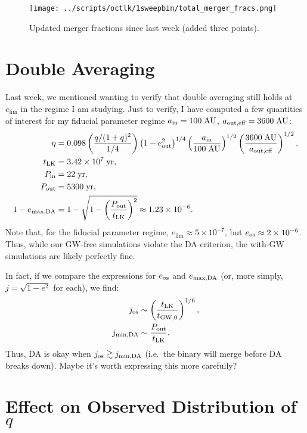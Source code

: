 \documentclass[11pt,
        usenames, %
        dvipsnames %
    ]{article}
\newcommand*{\scinot}[2]{#1\times10^{#2}}
\newcommand*{\p}[1]{\left(#1\right)}
\begin{document}
\begin{figure}[h]
    \centering
    \texttt{[image: ../scripts/octlk/1sweepbin/total\_merger\_fracs.png]}
    \caption{Updated merger fractions since last week (added three points).
    }\label{fig:merger_fracs}
\end{figure}

\section{Double Averaging}

Last week, we mentioned wanting to verify that double averaging still holds at
$e_{\lim}$ in the regime I am studying. Just to verify, I have computed a few
quantities of interest for my fiducial parameter regime $a_{\rm in} =
100\;\mathrm{AU}$, $a_{\rm out, eff} = 3600\;\mathrm{AU}$:
\begin{align}
    \eta &= 0.098\p{\frac{q / (1 + q)^2}{1/4}}\p{1 - e_{\rm out}^2}^{1/4}
        \p{\frac{a_{\rm in}}{100\;\mathrm{AU}}}^{1/2}
        \p{\frac{3600\;\mathrm{AU}}{a_{\rm out, eff}}}^{1/2},\\
    t_{\rm LK} &= \scinot{3.42}{7}\;\mathrm{yr},\\
    P_{\rm in} &= 22\;\mathrm{yr},\\
    P_{\rm out} &= 5300\;\mathrm{yr},\\
    1 - e_{\max, \rm DA} &= 1 - \sqrt{1 - \p{\frac{P_{\rm out}}{t_{\rm LK}}}^2}
        \approx \scinot{1.23}{-6}.
\end{align}
Note that, for the fiducial parameter regime, $e_{\lim} \approx \scinot{5}{-7}$,
but $e_{\rm os} \approx \scinot{2}{-6}$. Thus, while our GW-free simulations
violate the DA criterion, the with-GW simulations are likely perfectly fine.

In fact, if we compare the expressions for $e_{\rm os}$ and $e_{\max, \rm DA}$
(or, more simply, $j = \sqrt{1 - e^2}$ for each), we find:
\begin{align}
    j_{\rm os} &\sim \p{\frac{t_{\rm LK}}{t_{\rm GW, 0}}}^{1/6},\\
    j_{\min, \rm DA} &\sim \frac{P_{\rm out}}{t_{\rm LK}}.
\end{align}
Thus, DA is okay when $j_{\rm os} \gtrsim j_{\min, \rm DA}$ (i.e.\ the
binary will merge before DA breaks down). Maybe it's worth expressing this more
carefully?

\section{Effect on Observed Distribution of $q$}
\end{document}
